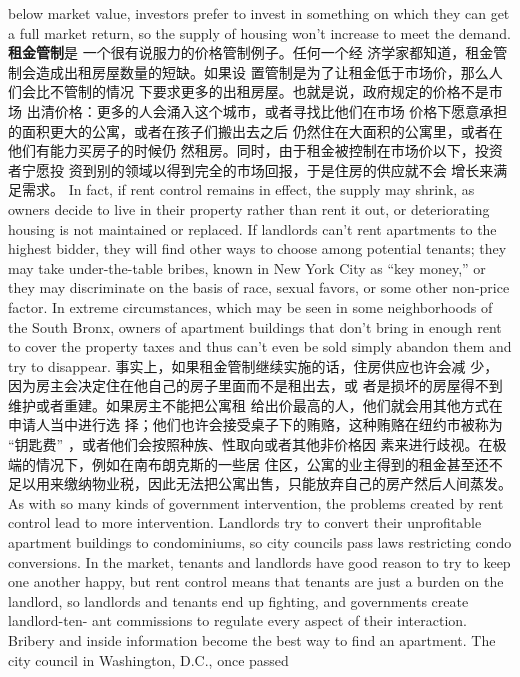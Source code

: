 \begin{paracol}{2}
below market value, investors prefer to invest in something on
which they can get a full market return, so the supply of housing won't increase to meet the demand.
\switchcolumn
\textbf{租金管制}是 一个很有说服力的价格管制例子。任何一个经
济学家都知道，租金管制会造成出租房屋数量的短缺。如果设
置管制是为了让租金低于市场价，那么人们会比不管制的情况
下要求更多的出租房屋。也就是说，政府规定的价格不是市场
出清价格：更多的人会涌入这个城市，或者寻找比他们在市场
价格下愿意承担的面积更大的公寓，或者在孩子们搬出去之后
仍然住在大面积的公寓里，或者在他们有能力买房子的时候仍
然租房。同时，由于租金被控制在市场价以下，投资者宁愿投
资到别的领域以得到完全的市场回报，于是住房的供应就不会
增长来满足需求。
\switchcolumn*
In fact, if rent control remains in effect, the supply may
shrink, as owners decide to live in their property rather than
rent it out, or deteriorating housing is not maintained or replaced. If landlords can't rent apartments to the highest bidder,
they will find other ways to choose among potential tenants;
they may take under-the-table bribes, known in New York City
as ``key money,'' or they may discriminate on the basis of race,
sexual favors, or some other non-price factor. In extreme circumstances, which may be seen in some neighborhoods of the South
Bronx, owners of apartment buildings that don't bring in
enough rent to cover the property taxes and thus can't even be
sold simply abandon them and try to disappear.
\switchcolumn
事实上，如果租金管制继续实施的话，住房供应也许会减
少，因为房主会决定住在他自己的房子里面而不是租出去，或
者是损坏的房屋得不到维护或者重建。如果房主不能把公寓租
给出价最高的人，他们就会用其他方式在申请人当中进行选
择；他们也许会接受桌子下的贿赂，这种贿赂在纽约市被称为
“钥匙费” ，或者他们会按照种族、性取向或者其他非价格因
素来进行歧视。在极端的情况下，例如在南布朗克斯的一些居
住区，公寓的业主得到的租金甚至还不足以用来缴纳物业税，因此无法把公寓出售，只能放弃自己的房产然后人间蒸发。
\switchcolumn*
As with so many kinds of government intervention, the
problems created by rent control lead to more intervention.
Landlords try to convert their unprofitable apartment buildings
to condominiums, so city councils pass laws restricting condo
conversions. In the market, tenants and landlords have good
reason to try to keep one another happy, but rent control means
that tenants are just a burden on the landlord, so landlords and
tenants end up fighting, and governments create landlord-ten-
ant commissions to regulate every aspect of their interaction.
Bribery and inside information become the best way to find an
apartment. The city council in Washington, D.C., once passed

\end{paracol}
